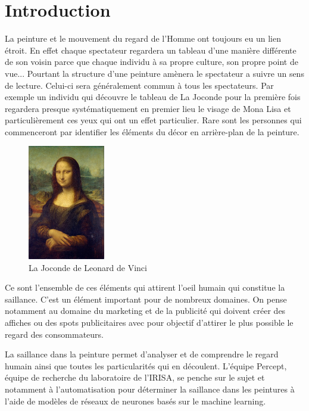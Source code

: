 \chapter{Introduction}


\par
La peinture et le mouvement du regard de l'Homme ont toujours eu un lien étroit. En effet chaque spectateur regardera un tableau d'une manière différente de son voisin parce que chaque individu à sa propre culture, son propre point de vue... Pourtant la structure d'une peinture amènera le spectateur a suivre un sens de lecture. Celui-ci sera généralement commun à tous les spectateurs. Par exemple un individu qui découvre le tableau de La Joconde pour la première fois regardera presque systématiquement en premier lieu le visage de Mona Lisa et particulièrement ces yeux qui ont un effet particulier. Rare sont les personnes qui commenceront par identifier les éléments du décor en arrière-plan de la peinture.

\begin{figure}[h]
    \centering
    \includegraphics[width=0.3\textwidth]
                    {datas/Mona_Lisa_by_Leonardo_da_Vinci.jpg}
    \caption{La Joconde de Leonard de Vinci}
\end{figure}

\par
Ce sont l'ensemble de ces éléments qui attirent l'oeil humain qui constitue la saillance. C'est un élément important pour de nombreux domaines. On pense notamment au domaine du marketing et de la publicité qui doivent créer des affiches ou des spots publicitaires avec pour objectif d'attirer le plus possible le regard des consommateurs.

\par
La saillance dans la peinture permet d'analyser et de comprendre le regard humain ainsi que toutes les particularités qui en découlent. L'équipe Percept, équipe de recherche du laboratoire de l'IRISA, se penche sur le sujet et notamment à l'automatisation pour déterminer la saillance dans les peintures à l'aide de modèles de réseaux de neurones basés sur le machine learning.

